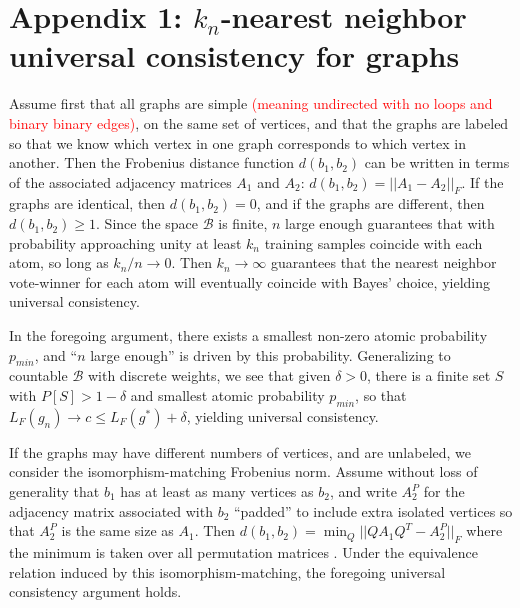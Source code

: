 \documentclass{article}
\newcommand{\mB}{\mathcal{B}}
\providecommand{\tr}[1]{\textcolor{red}{#1}}
\begin{document}






\section*{Appendix 1: $k_n$-nearest neighbor universal consistency for graphs}
\label{proof}

Assume first that all graphs are simple \tr{(meaning undirected with no loops and binary binary edges)}, on the same set of vertices, and that the graphs are labeled so that we know which vertex in one graph corresponds to which vertex in another. Then the Frobenius distance function $d(b_1,b_2)$ can be written in terms of the associated adjacency matrices $A_1$ and $A_2$: $d(b_1,b_2) = ||A_1-A_2||_F$. If the graphs are identical, then $d(b_1,b_2) = 0$, and if the graphs are different, then $d(b_1,b_2) \geq 1$. Since the space $\mB$ is finite, $n$ large enough guarantees that with probability approaching unity at least $k_n$ training samples coincide with each atom, so long as $k_n/n \rightarrow 0$. Then $k_n \rightarrow \infty$ guarantees that the nearest neighbor vote-winner for each atom will eventually coincide with Bayes' choice, yielding universal consistency.

In the foregoing argument, there exists a smallest non-zero atomic probability $p_{min}$, and ``$n$ large enough'' is driven by this probability. Generalizing to countable $\mB$ with discrete weights, we see that given $\delta > 0$, there is a finite set $S$ with $P[S]>1-\delta$ and smallest atomic probability $p_{min}$, so that $L_{F}(g_n) \rightarrow c \leq L_{F}(g^*) + \delta$, yielding universal consistency.

If the graphs may have different numbers of vertices, and are unlabeled, we consider the isomorphism-matching Frobenius norm. Assume without loss of generality that $b_1$ has at least as many vertices as $b_2$, and write $A_2^P$ for the adjacency matrix associated with $b_2$ ``padded'' to include extra isolated vertices so that $A_2^P$ is the same size as $A_1$. Then $d(b_1,b_2) = \min_Q ||Q A_1 Q^T - A_2^P||_F$ where the minimum is taken over all permutation matrices \cite{HornJohnson90}. Under the equivalence relation induced by this isomorphism-matching, the foregoing universal consistency argument holds.
\end{document}
